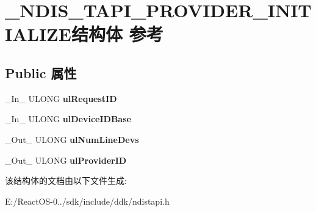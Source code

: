 \hypertarget{struct___n_d_i_s___t_a_p_i___p_r_o_v_i_d_e_r___i_n_i_t_i_a_l_i_z_e}{}\section{\+\_\+\+N\+D\+I\+S\+\_\+\+T\+A\+P\+I\+\_\+\+P\+R\+O\+V\+I\+D\+E\+R\+\_\+\+I\+N\+I\+T\+I\+A\+L\+I\+Z\+E结构体 参考}
\label{struct___n_d_i_s___t_a_p_i___p_r_o_v_i_d_e_r___i_n_i_t_i_a_l_i_z_e}
\subsection*{Public 属性}
\begin{DoxyCompactItemize}
\item 
\mbox{\label{struct___n_d_i_s___t_a_p_i___p_r_o_v_i_d_e_r___i_n_i_t_i_a_l_i_z_e_a12419fb4f8d956452706b4fbd7d47084}} 
\+\_\+\+In\+\_\+ U\+L\+O\+NG {\bfseries ul\+Request\+ID}
\item 
\mbox{\label{struct___n_d_i_s___t_a_p_i___p_r_o_v_i_d_e_r___i_n_i_t_i_a_l_i_z_e_af2eaa5c5fbff9a2f0638a2d898fa6fc2}} 
\+\_\+\+In\+\_\+ U\+L\+O\+NG {\bfseries ul\+Device\+I\+D\+Base}
\item 
\mbox{\label{struct___n_d_i_s___t_a_p_i___p_r_o_v_i_d_e_r___i_n_i_t_i_a_l_i_z_e_a47e092892fdc675b4515bef02e7f60dd}} 
\+\_\+\+Out\+\_\+ U\+L\+O\+NG {\bfseries ul\+Num\+Line\+Devs}
\item 
\mbox{\label{struct___n_d_i_s___t_a_p_i___p_r_o_v_i_d_e_r___i_n_i_t_i_a_l_i_z_e_afd5f3d8ede088f18812326b08fb9d305}} 
\+\_\+\+Out\+\_\+ U\+L\+O\+NG {\bfseries ul\+Provider\+ID}
\end{DoxyCompactItemize}


该结构体的文档由以下文件生成\+:\begin{DoxyCompactItemize}
\item 
E\+:/\+React\+O\+S-\/0../sdk/include/ddk/ndistapi.\+h\end{DoxyCompactItemize}
